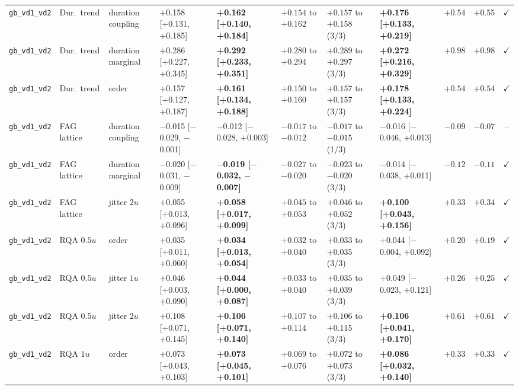 \begin{longtable}{lllllllllrc}
\texttt{gb\_vd1\_vd2} & Dur.\ trend & duration coupling & +0.158 [+0.131, +0.185] & \textbf{+0.162 [+0.140, +0.184]} & $+0.154$ to $+0.162$ & $+0.157$ to $+0.158$ (3/3) & \textbf{+0.176 [+0.133, +0.219]} & $+0.54$ & $+0.55$ & $\checkmark$ \\
\texttt{gb\_vd1\_vd2} & Dur.\ trend & duration marginal & +0.286 [+0.227, +0.345] & \textbf{+0.292 [+0.233, +0.351]} & $+0.280$ to $+0.294$ & $+0.289$ to $+0.297$ (3/3) & \textbf{+0.272 [+0.216, +0.329]} & $+0.98$ & $+0.98$ & $\checkmark$ \\
\texttt{gb\_vd1\_vd2} & Dur.\ trend & order & +0.157 [+0.127, +0.187] & \textbf{+0.161 [+0.134, +0.188]} & $+0.150$ to $+0.160$ & $+0.157$ to $+0.157$ (3/3) & \textbf{+0.178 [+0.133, +0.224]} & $+0.54$ & $+0.54$ & $\checkmark$ \\
\texttt{gb\_vd1\_vd2} & FAG lattice & duration coupling & $-$0.015 [$-$0.029, $-$0.001] & $-$0.012 [$-$0.028, +0.003] & $-0.017$ to $-0.012$ & $-0.017$ to $-0.015$ (1/3) & $-$0.016 [$-$0.046, +0.013] & $-0.09$ & $-0.07$ & -- \\
\texttt{gb\_vd1\_vd2} & FAG lattice & duration marginal & $-$0.020 [$-$0.031, $-$0.009] & \textbf{$-$0.019 [$-$0.032, $-$0.007]} & $-0.027$ to $-0.020$ & $-0.023$ to $-0.020$ (3/3) & $-$0.014 [$-$0.038, +0.011] & $-0.12$ & $-0.11$ & $\checkmark$ \\
\texttt{gb\_vd1\_vd2} & FAG lattice & jitter $2u$ & +0.055 [+0.013, +0.096] & \textbf{+0.058 [+0.017, +0.099]} & $+0.045$ to $+0.053$ & $+0.046$ to $+0.052$ (3/3) & \textbf{+0.100 [+0.043, +0.156]} & $+0.33$ & $+0.34$ & $\checkmark$ \\
\texttt{gb\_vd1\_vd2} & RQA $0.5u$ & order & +0.035 [+0.011, +0.060] & \textbf{+0.034 [+0.013, +0.054]} & $+0.032$ to $+0.040$ & $+0.033$ to $+0.035$ (3/3) & +0.044 [$-$0.004, +0.092] & $+0.20$ & $+0.19$ & $\checkmark$ \\
\texttt{gb\_vd1\_vd2} & RQA $0.5u$ & jitter $1u$ & +0.046 [+0.003, +0.090] & \textbf{+0.044 [+0.000, +0.087]} & $+0.033$ to $+0.040$ & $+0.035$ to $+0.039$ (3/3) & +0.049 [$-$0.023, +0.121] & $+0.26$ & $+0.25$ & $\checkmark$ \\
\texttt{gb\_vd1\_vd2} & RQA $0.5u$ & jitter $2u$ & +0.108 [+0.071, +0.145] & \textbf{+0.106 [+0.071, +0.140]} & $+0.107$ to $+0.114$ & $+0.106$ to $+0.115$ (3/3) & \textbf{+0.106 [+0.041, +0.170]} & $+0.61$ & $+0.61$ & $\checkmark$ \\
\texttt{gb\_vd1\_vd2} & RQA $1u$ & order & +0.073 [+0.043, +0.103] & \textbf{+0.073 [+0.045, +0.101]} & $+0.069$ to $+0.076$ & $+0.072$ to $+0.073$ (3/3) & \textbf{+0.086 [+0.032, +0.140]} & $+0.33$ & $+0.33$ & $\checkmark$ \\

\end{longtable}
